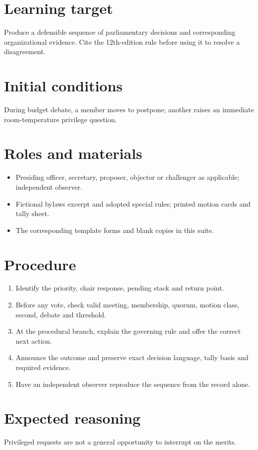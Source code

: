 \documentclass[11pt]{article}
\begin{document}
\SuiteOpen
\section{Learning target}
Produce a defensible sequence of parliamentary decisions and corresponding organizational evidence. Cite the 12th-edition rule before using it to resolve a disagreement.

\section{Initial conditions}
During budget debate, a member moves to postpone; another raises an immediate room-temperature privilege question.

\section{Roles and materials}
\begin{itemize}[leftmargin=*,itemsep=4pt]
\item Presiding officer, secretary, proposer, objector or challenger as applicable; independent observer.
\item Fictional bylaws excerpt and adopted special rules; printed motion cards and tally sheet.
\item The corresponding template forms and blank copies in this suite.
\end{itemize}

\section{Procedure}
\begin{enumerate}[leftmargin=*,itemsep=4pt]
\item Identify the priority, chair response, pending stack and return point.
\item Before any vote, check valid meeting, membership, quorum, motion class, second, debate and threshold.
\item At the procedural branch, explain the governing rule and offer the correct next action.
\item Announce the outcome and preserve exact decision language, tally basis and required evidence.
\item Have an independent observer reproduce the sequence from the record alone.
\end{enumerate}

\section{Expected reasoning}
Privileged requests are not a general opportunity to interrupt on the merits.
\end{document}

